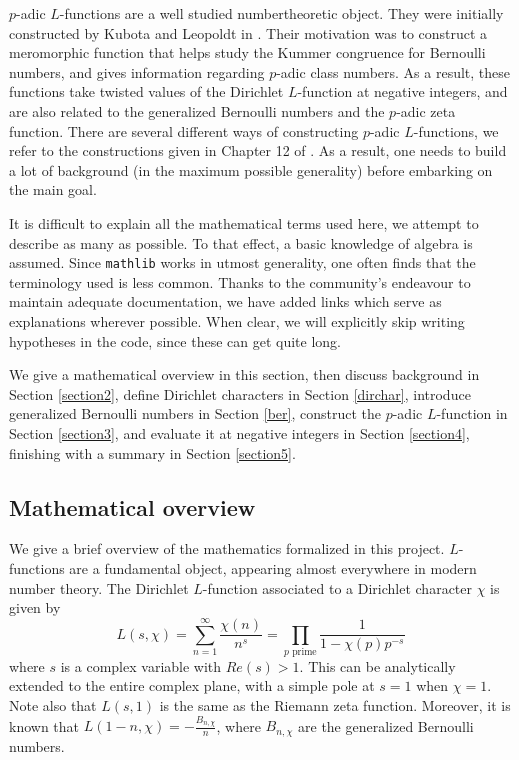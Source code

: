 \documentclass[a4paper,UKenglish,cleveref, autoref, thm-restate,pdfa]{lipics-v2021}
\newcommand{\lean}[1]{\texttt{#1}\xspace} %
\begin{document}
$p$-adic $L$-functions are a well studied numbertheoretic object. They were initially constructed 
by Kubota and Leopoldt in \cite{KL}. Their motivation was to construct a meromorphic function that helps study 
the Kummer congruence for Bernoulli numbers, and gives information regarding $p$-adic class numbers. 
As a result, these functions take twisted values of the Dirichlet $L$-function at negative integers, and 
are also related to the generalized Bernoulli numbers and the $p$-adic zeta function. There are several different ways of 
constructing $p$-adic $L$-functions, we refer to the constructions
given in Chapter 12 of \cite{cyc}. As a result, one needs to build a lot of background (in the maximum possible generality) 
before embarking on the main goal.

It is difficult to explain all the mathematical terms used here, we attempt to describe as many as possible. To that effect, 
a basic knowledge of algebra is assumed. Since \lean{mathlib} works in utmost generality, one often finds that the terminology 
used is less common. Thanks to the community's endeavour to maintain adequate documentation, we have added links which serve as 
explanations wherever possible. When clear, we will explicitly skip writing hypotheses in the code, since these can get quite long.

We give a mathematical overview in this section, then discuss background in Section \ref{section2}, define Dirichlet characters in Section \ref{dirchar}, 
introduce generalized Bernoulli numbers in Section \ref{ber}, construct the $p$-adic $L$-function in Section \ref{section3}, and evaluate it at negative integers in Section \ref{section4}, finishing with a summary in Section \ref{section5}. 
\subsection{Mathematical overview}
We give a brief overview of the mathematics formalized in this project. 
$L$-functions are a fundamental object, appearing almost everywhere in modern 
number theory. The Dirichlet $L$-function associated to a Dirichlet character $\chi$ is given by  
$$ L(s, \chi) = \sum_{n = 1}^{\infty} \frac{\chi (n)}{n^s} = \prod_{p \text{ prime}} \frac{1}{1 - \chi (p) p^{-s}}$$
where $s$ is a complex variable with $Re(s) > 1$. This can be analytically extended 
to the entire complex plane, with a simple pole at $s = 1$ when $\chi = 1$. Note also 
that $L(s, 1)$ is the same as the Riemann zeta function. Moreover, it is known that 
$L(1 - n, \chi) = - \frac{B_{n, \chi}}{n}$, where $B_{n, \chi}$ are the generalized 
Bernoulli numbers. 
\end{document}
